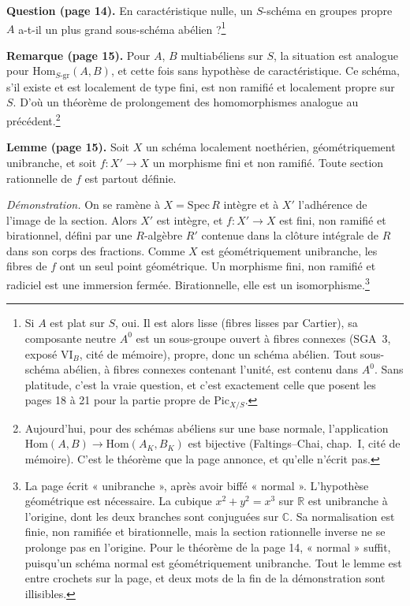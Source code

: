 \documentclass[11pt,a4paper]{article}
\begin{document}
\textbf{Question (page 14).} En caractéristique nulle, un $S$-schéma en groupes
propre $A$ a-t-il un plus grand sous-schéma abélien ?\footnote{Si $A$ est plat
sur $S$, oui. Il est alors lisse (fibres lisses par Cartier), sa composante
neutre $A^{0}$ est un sous-groupe ouvert à fibres connexes (SGA~3,
exposé VI$_{B}$, cité de mémoire), propre, donc un schéma abélien. Tout
sous-schéma abélien, à fibres connexes contenant l'unité, est contenu dans
$A^{0}$. Sans platitude, c'est la vraie question, et c'est exactement celle que
posent les pages 18 à 21 pour la partie propre de $\mathrm{Pic}_{X/S}$.}

\textbf{Remarque (page 15).} Pour $A$, $B$ multiabéliens sur $S$, la situation
est analogue pour $\mathrm{Hom}_{S\text{-gr}}(A, B)$, et cette fois sans
hypothèse de caractéristique. Ce schéma, s'il existe et est localement de type
fini, est non ramifié et localement propre sur $S$. D'où un théorème de
prolongement des homomorphismes analogue au précédent.\footnote{Aujourd'hui,
pour des schémas abéliens sur une base normale, l'application
$\mathrm{Hom}(A, B) \to \mathrm{Hom}(A_K, B_K)$ est bijective (Faltings--Chai,
chap.~I, cité de mémoire). C'est le théorème que la page annonce, et qu'elle
n'écrit pas.}

\textbf{Lemme (page 15).} Soit $X$ un schéma localement noethérien,
géométriquement unibranche, et soit $f \colon X' \to X$ un morphisme fini et non
ramifié. Toute section rationnelle de $f$ est partout définie.

\emph{Démonstration.} On se ramène à $X = \mathrm{Spec}\, R$ intègre et à $X'$
l'adhérence de l'image de la section. Alors $X'$ est intègre, et
$f \colon X' \to X$ est fini, non ramifié et birationnel, défini par une
$R$-algèbre $R'$ contenue dans la clôture intégrale de $R$ dans son corps des
fractions. Comme $X$ est géométriquement unibranche, les fibres de $f$ ont un
seul point géométrique. Un morphisme fini, non ramifié et radiciel est une
immersion fermée. Birationnelle, elle est un isomorphisme.\footnote{La page
écrit « unibranche », après avoir biffé « normal ». L'hypothèse géométrique est
nécessaire. La cubique $x^{2} + y^{2} = x^{3}$ sur $\mathbb{R}$ est unibranche
à l'origine, dont les deux branches sont conjuguées sur $\mathbb{C}$. Sa
normalisation est finie, non ramifiée et birationnelle, mais la section
rationnelle inverse ne se prolonge pas en l'origine. Pour le théorème de la
page 14, « normal » suffit, puisqu'un schéma normal est géométriquement
unibranche. Tout le lemme est entre crochets sur la page, et deux mots de la
fin de la démonstration sont illisibles.}
\end{document}
